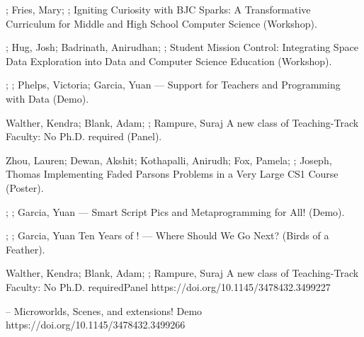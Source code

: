 \begin{etaremune}
    \item{\dan; Fries, Mary; \me; \lauren \newline Igniting Curiosity with BJC Sparks: A Transformative Curriculum for Middle and High School Computer Science (Workshop). }
    
    \item{\dan; Hug, Josh; Badrinath, Anirudhan;  \me; \lauren \newline Student Mission Control: Integrating Space Data Exploration into Data and Computer Science Education (Workshop). }

    \item{\me; \dan; Phelps, Victoria; Garcia, Yuan \newline {} — Support for Teachers and Programming with Data (Demo). }
    
    \item{Walther, Kendra; Blank, Adam; \me; Rampure, Suraj
    \newline A new class of Teaching-Track Faculty: No Ph.D. required (Panel).  }
    
    \item{Zhou, Lauren; Dewan, Akshit; Kothapalli, Anirudh; Fox, Pamela; \me; Joseph, Thomas
    \newline
    Implementing Faded Parsons Problems in a Very Large CS1 Course (Poster). }
    
    \item{\me; \dan; Garcia, Yuan \newline {} — Smart Script Pics and Metaprogramming for All! (Demo). }

    \item{\me; \dan; Garcia, Yuan \newline Ten Years of \snap! — Where Should We Go Next? (Birds of a Feather). }
    
    \sigcsePVD
        {Walther, Kendra; Blank, Adam; \me; Rampure, Suraj}
        {A new class of Teaching-Track Faculty: No Ph.D. required}{Panel}
        {https://doi.org/10.1145/3478432.3499227}
    
        { – Microworlds, Scenes, and extensions!}
        {Demo}
        {https://doi.org/10.1145/3478432.3499266} 


\end{etaremune}
